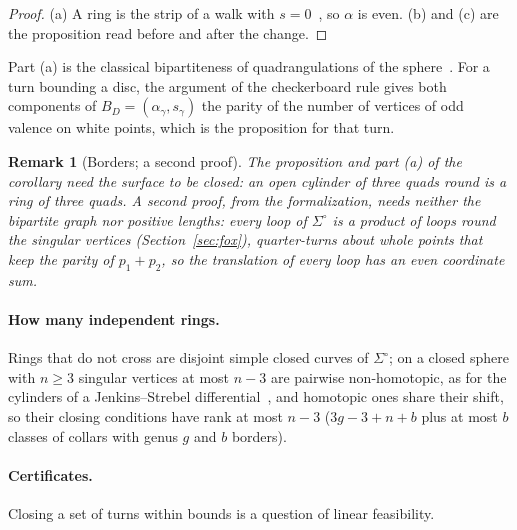 \documentclass[11pt,a4paper]{article}
\newtheorem{remark}{Remark}
\newcommand{\shift}{s}
\begin{document}
\begin{proof}
(a) A ring is the strip of a walk with $\shift =
0$~\cite[Prop.~2]{gardent2026loops}, so $\alpha$ is even. (b) and (c) are the
proposition read before and after the change.
\end{proof}

Part (a) is the classical bipartiteness of quadrangulations of the
sphere~\cite[Lemma~3.1]{kaiser2015colouring}. For a turn bounding a disc, the
argument of the checkerboard rule gives both components of $B_D =
(\alpha_\gamma, \shift_\gamma)$ the parity of the number of vertices of odd
valence on white points, which is the proposition for that turn.

\begin{remark}[Borders; a second proof]\label{rem:borders}
The proposition and part (a) of the corollary need the surface to be closed:
an open cylinder of three quads round is a ring of three quads. A second proof,
from the formalization, needs neither the bipartite graph nor positive
lengths: every loop of $\Sigma^\circ$ is a product of loops round the
singular vertices (Section~\ref{sec:fox}), quarter-turns about whole points
that keep the parity of $p_1 + p_2$, so the translation of every loop has an
even coordinate sum.
\end{remark}

\paragraph{How many independent rings.}
Rings that do not cross are disjoint simple closed curves of $\Sigma^\circ$;
on a closed sphere with $n \ge 3$ singular vertices at most $n - 3$ are
pairwise non-homotopic, as for the cylinders of a Jenkins--Strebel
differential~\cite{strebel1984quadratic}, and homotopic ones share their shift,
so their closing conditions have rank at most $n - 3$ ($3g - 3 + n + b$ plus at
most $b$ classes of collars with genus $g$ and $b$ borders).

\paragraph{Certificates.}
Closing a set of turns within bounds is a question of linear feasibility.
\end{document}

